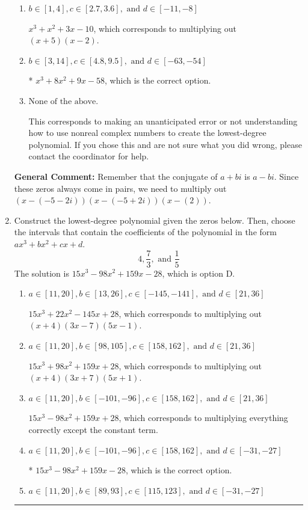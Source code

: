 \documentclass{extbook}[14pt]
\newcommand{\litem}[1]{\item #1

\rule{\textwidth}{0.4pt}}
\begin{document}
\begin{enumerate}
{\begin{enumerate}[label=\Alph*.]
$x^{3} + x^{2} -4$, which corresponds to multiplying out $(x + 2)(x -2)$.
\item \( b \in [1, 4], c \in [2.7, 3.6], \text{ and } d \in [-11, -8] \)

$x^{3} + x^{2} +3 x -10$, which corresponds to multiplying out $(x + 5)(x -2)$.
\item \( b \in [3, 14], c \in [4.8, 9.5], \text{ and } d \in [-63, -54] \)

* $x^{3} +8 x^{2} +9 x -58$, which is the correct option.
\item \( \text{None of the above.} \)

This corresponds to making an unanticipated error or not understanding how to use nonreal complex numbers to create the lowest-degree polynomial. If you chose this and are not sure what you did wrong, please contact the coordinator for help.
\end{enumerate}

\textbf{General Comment:} Remember that the conjugate of $a+bi$ is $a-bi$. Since these zeros always come in pairs, we need to multiply out $(x-(-5 - 2 i))(x-(-5 + 2 i))(x-(2))$.
}
\litem{
Construct the lowest-degree polynomial given the zeros below. Then, choose the intervals that contain the coefficients of the polynomial in the form $ax^3+bx^2+cx+d$.
\[ 4, \frac{7}{3}, \text{ and } \frac{1}{5} \]The solution is \( 15x^{3} -98 x^{2} +159 x -28 \), which is option D.\begin{enumerate}[label=\Alph*.]
\item \( a \in [11, 20], b \in [13, 26], c \in [-145, -141], \text{ and } d \in [21, 36] \)

$15x^{3} +22 x^{2} -145 x + 28$, which corresponds to multiplying out $(x + 4)(3x -7)(5x -1)$.
\item \( a \in [11, 20], b \in [98, 105], c \in [158, 162], \text{ and } d \in [21, 36] \)

$15x^{3} +98 x^{2} +159 x + 28$, which corresponds to multiplying out $(x + 4)(3x + 7)(5x + 1)$.
\item \( a \in [11, 20], b \in [-101, -96], c \in [158, 162], \text{ and } d \in [21, 36] \)

$15x^{3} -98 x^{2} +159 x + 28$, which corresponds to multiplying everything correctly except the constant term.
\item \( a \in [11, 20], b \in [-101, -96], c \in [158, 162], \text{ and } d \in [-31, -27] \)

* $15x^{3} -98 x^{2} +159 x -28$, which is the correct option.
\item \( a \in [11, 20], b \in [89, 93], c \in [115, 123], \text{ and } d \in [-31, -27] \)


\end{enumerate}}
\end{enumerate}
\end{document}
